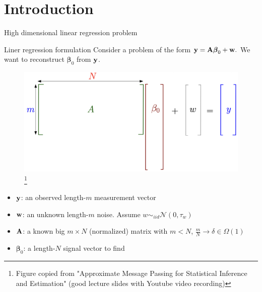 \documentclass[aspectratio=43, 10pt]{beamer}
\begin{document}
\section{Introduction}
\begin{frame}{High dimensional linear regression problem}
    \vspace{-3mm}
    \begin{block}{Liner regression formulation}
        Consider a problem of the form $\bold{y} = \bold{A} \boldsymbol{\beta}_0 + \bold{w}.$ We want to reconstruct $\boldsymbol{\beta}_0$ from $\bold{y}$. 
    \end{block}

    \vspace{-2mm}
    \begin{figure}
        \centering
        \includegraphics[width=0.6\linewidth]{figures/vis_formulation.png}\footnote{Figure copied from "Approximate Message Passing for Statistical Inference and Estimation" (good lecture slides with Youtube video recording)}
    \end{figure}

    \pause
    \vspace{-4mm}
    \begin{itemize}
        \item $\bold{y}$: an observed length-$m$ measurement vector
        \item $\bold{w}$: an unknown length-$m$ noise. Assume $w \sim_{iid} \mathcal{N}(0, \tau_w)$
        \item $\bold{A}$: a known big $m\times N$ (normalized) matrix with $m<N$, $\frac{m}{N} \to \delta \in \Omega(1)$ 
        \item $\boldsymbol{\beta}_0$: a length-$N$ signal vector to find
    \end{itemize}
\end{frame}
\end{document}
